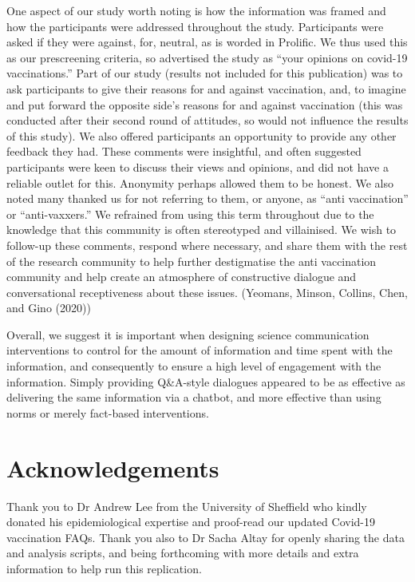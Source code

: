 \documentclass[
  english,
  ,jou,floatsintext]{apa6}
\begin{document}
One aspect of our study worth noting is how the information was framed and how the participants were addressed throughout the study. Participants were asked if they were against, for, neutral, as is worded in Prolific. We thus used this as our prescreening criteria, so advertised the study as ``your opinions on covid-19 vaccinations.'' Part of our study (results not included for this publication) was to ask participants to give their reasons for and against vaccination, and, to imagine and put forward the opposite side's reasons for and against vaccination (this was conducted after their second round of attitudes, so would not influence the results of this study). We also offered participants an opportunity to provide any other feedback they had. These comments were insightful, and often suggested participants were keen to discuss their views and opinions, and did not have a reliable outlet for this. Anonymity perhaps allowed them to be honest. We also noted many thanked us for not referring to them, or anyone, as ``anti vaccination'' or ``anti-vaxxers.'' We refrained from using this term throughout due to the knowledge that this community is often stereotyped and villainised. We wish to follow-up these comments, respond where necessary, and share them with the rest of the research community to help further destigmatise the anti vaccination community and help create an atmosphere of constructive dialogue and conversational receptiveness about these issues. (Yeomans, Minson, Collins, Chen, and Gino (2020))

Overall, we suggest it is important when designing science communication interventions to control for the amount of information and time spent with the information, and consequently to ensure a high level of engagement with the information. Simply providing Q\&A-style dialogues appeared to be as effective as delivering the same information via a chatbot, and more effective than using norms or merely fact-based interventions.

\hypertarget{acknowledgements}{%
\section{Acknowledgements}\label{acknowledgements}}

Thank you to Dr Andrew Lee from the University of Sheffield who kindly donated his epidemiological expertise and proof-read our updated Covid-19 vaccination FAQs.
Thank you also to Dr Sacha Altay for openly sharing the data and analysis scripts, and being forthcoming with more details and extra information to help run this replication.
\end{document}
